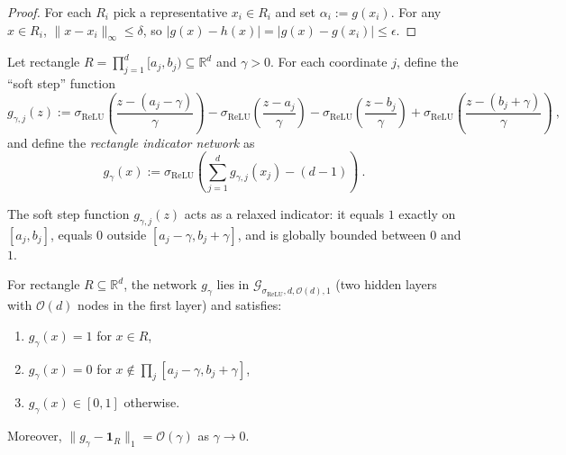 \begin{proof}
  For each $R_i$ pick a representative $x_i \in R_i$ and set $\alpha_i := g(x_i)$.
  For any $x \in R_i$, $\|x - x_i\|_\infty \le \delta$, so $|g(x) - h(x)| = |g(x) - g(x_i)| \le \epsilon$.
\end{proof}

\begin{definition}\label{def:rectIndicatorNet}
Let rectangle $R = \prod_{j=1}^d [a_j, b_j) \subseteq \mathbb{R}^d$ and $\gamma > 0$.
For each coordinate $j$, define the ``soft step'' function
\[
  g_{\gamma,j}(z) := \sigma_\mathrm{ReLU}\!\left(\frac{z-(a_j-\gamma)}{\gamma}\right)
    - \sigma_\mathrm{ReLU}\!\left(\frac{z-a_j}{\gamma}\right)
    - \sigma_\mathrm{ReLU}\!\left(\frac{z-b_j}{\gamma}\right)
    + \sigma_\mathrm{ReLU}\!\left(\frac{z-(b_j+\gamma)}{\gamma}\right)
  \: ,
\]
and define the \emph{rectangle indicator network} as
\[
  g_\gamma(x) := \sigma_\mathrm{ReLU}\!\left(\sum_{j=1}^d g_{\gamma,j}(x_j) - (d-1)\right)
  \: .
\]
\end{definition}

\begin{lemma}\label{lem:softStepProps}
The soft step function $g_{\gamma,j}(z)$ acts as a relaxed indicator: it equals $1$ exactly on $[a_j, b_j]$, equals $0$ outside $[a_j - \gamma, b_j + \gamma]$, and is globally bounded between $0$ and $1$.
\end{lemma}

\begin{lemma}\label{lem:rectIndicator}
For rectangle $R \subseteq \mathbb{R}^d$, the network $g_\gamma$ lies in $\mathcal{G}_{\sigma_\mathrm{ReLU},d,\mathcal{O}(d),1}$ (two hidden layers with $\mathcal{O}(d)$ nodes in the first layer) and satisfies:
\begin{enumerate}
  \item $g_\gamma(x) = 1$ for $x \in R$,
  \item $g_\gamma(x) = 0$ for $x \notin \prod_j [a_j - \gamma, b_j + \gamma]$,
  \item $g_\gamma(x) \in [0,1]$ otherwise.
\end{enumerate}
Moreover, $\|g_\gamma - \mathbf{1}_R\|_1 = \mathcal{O}(\gamma)$ as $\gamma \to 0$.
\end{lemma}

